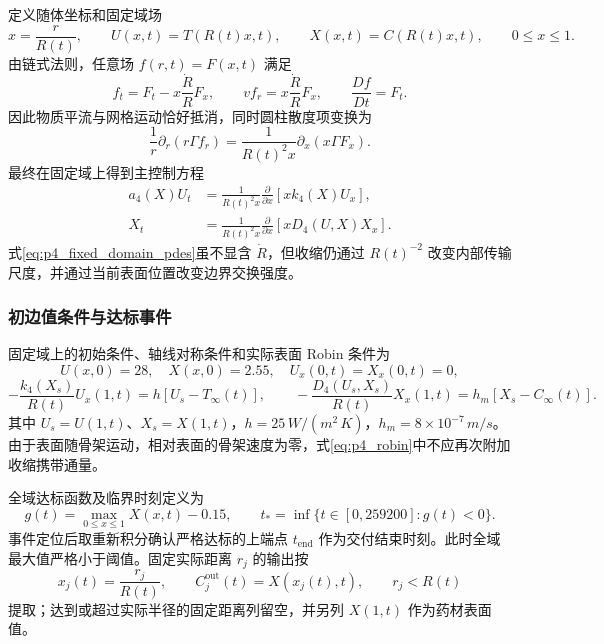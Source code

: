 \documentclass[withoutpreface,bwprint]{cumcmthesis}
\begin{document}
定义随体坐标和固定域场
\begin{equation}
x=\frac{r}{R(t)},\qquad
U(x,t)=T(R(t)x,t),\qquad X(x,t)=C(R(t)x,t),\qquad 0\le x\le1.
\label{eq:p4_coordinate_transform}
\end{equation}
由链式法则，任意场 $f(r,t)=F(x,t)$ 满足
\begin{equation}
f_t=F_t-x\frac{\dot R}{R}F_x,\qquad
vf_r=x\frac{\dot R}{R}F_x,\qquad
\frac{Df}{Dt}=F_t.
\label{eq:p4_material_derivative}
\end{equation}
因此物质平流与网格运动恰好抵消，同时圆柱散度项变换为
\begin{equation}
\frac{1}{r}\partial_r(r\Gamma f_r)
=\frac{1}{R(t)^2x}\partial_x(x\Gamma F_x).
\label{eq:p4_divergence_transform}
\end{equation}
最终在固定域上得到主控制方程
\begin{equation}
\boxed{\begin{aligned}
a_4(X)U_t&=\frac{1}{R(t)^2x}\frac{\partial}{\partial x}
\left[xk_4(X)U_x\right],\\
X_t&=\frac{1}{R(t)^2x}\frac{\partial}{\partial x}
\left[xD_4(U,X)X_x\right].
\end{aligned}}
\label{eq:p4_fixed_domain_pdes}
\end{equation}
式\eqref{eq:p4_fixed_domain_pdes}虽不显含 $\dot R$，但收缩仍通过 $R(t)^{-2}$ 改变内部传输尺度，并通过当前表面位置改变边界交换强度。

\subsubsection{初边值条件与达标事件}

固定域上的初始条件、轴线对称条件和实际表面 Robin 条件为
\begin{equation}
U(x,0)=28,\quad X(x,0)=2.55,\quad
U_x(0,t)=X_x(0,t)=0,
\label{eq:p4_initial_center}
\end{equation}
\begin{equation}
-\frac{k_4(X_s)}{R(t)}U_x(1,t)=h[U_s-T_\infty(t)],\qquad
-\frac{D_4(U_s,X_s)}{R(t)}X_x(1,t)=h_m[X_s-C_\infty(t)].
\label{eq:p4_robin}
\end{equation}
其中 $U_s=U(1,t)$、$X_s=X(1,t)$，$h=25\,\si{W/(m^2\,K)}$，$h_m=8\times10^{-7}\,\si{m/s}$。由于表面随骨架运动，相对表面的骨架速度为零，式\eqref{eq:p4_robin}中不应再次附加收缩携带通量。

全域达标函数及临界时刻定义为
\begin{equation}
g(t)=\max_{0\le x\le1}X(x,t)-0.15,\qquad
t_*=\inf\{t\in[0,259200]:g(t)<0\}.
\label{eq:p4_event}
\end{equation}
事件定位后取重新积分确认严格达标的上端点 $t_{\mathrm{end}}$ 作为交付结束时刻。此时全域最大值严格小于阈值。固定实际距离 $r_j$ 的输出按
\begin{equation}
x_j(t)=\frac{r_j}{R(t)},\qquad
C_j^{\mathrm{out}}(t)=X(x_j(t),t),\qquad r_j<R(t)
\label{eq:p4_output_mapping}
\end{equation}
提取；达到或超过实际半径的固定距离列留空，并另列 $X(1,t)$ 作为药材表面值。
\end{document}

